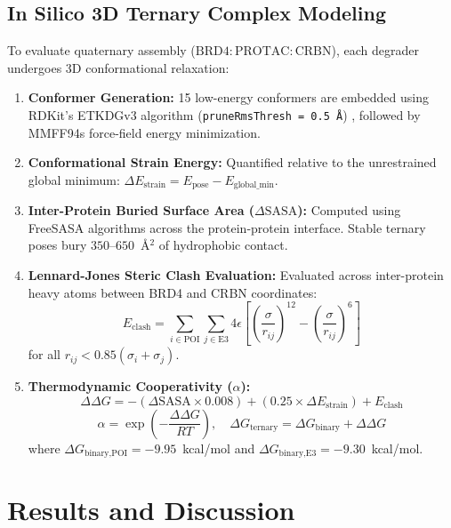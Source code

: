 \documentclass[conference]{IEEEtran}
\begin{document}
\subsection{In Silico 3D Ternary Complex Modeling}
To evaluate quaternary assembly ($\text{BRD4} : \text{PROTAC} : \text{CRBN}$), each degrader undergoes 3D conformational relaxation:
\begin{enumerate}
    \item \textbf{Conformer Generation:} 15 low-energy conformers are embedded using RDKit's ETKDGv3 algorithm (\texttt{pruneRmsThresh = 0.5 \AA}) \cite{riniker2015}, followed by MMFF94s force-field energy minimization.
    \item \textbf{Conformational Strain Energy:} Quantified relative to the unrestrained global minimum: $\Delta E_{\text{strain}} = E_{\text{pose}} - E_{\text{global\_min}}$.
    \item \textbf{Inter-Protein Buried Surface Area ($\Delta\text{SASA}$):} Computed using FreeSASA algorithms across the protein-protein interface. Stable ternary poses bury $350\text{--}650$~\AA$^2$ of hydrophobic contact.
    \item \textbf{Lennard-Jones Steric Clash Evaluation:} Evaluated across inter-protein heavy atoms between BRD4 and CRBN coordinates:
    \begin{equation}
    E_{\text{clash}} = \sum_{i \in \text{POI}} \sum_{j \in \text{E3}} 4\epsilon \left[ \left(\frac{\sigma}{r_{ij}}\right)^{12} - \left(\frac{\sigma}{r_{ij}}\right)^6 \right]
    \end{equation}
    for all $r_{ij} < 0.85(\sigma_i + \sigma_j)$.
    \item \textbf{Thermodynamic Cooperativity ($\alpha$):}
    \begin{equation}
    \Delta\Delta G = -(\Delta\text{SASA} \times 0.008) + (0.25 \times \Delta E_{\text{strain}}) + E_{\text{clash}}
    \end{equation}
    \begin{equation}
    \alpha = \exp\left(-\frac{\Delta\Delta G}{RT}\right), \quad \Delta G_{\text{ternary}} = \Delta G_{\text{binary}} + \Delta\Delta G
    \end{equation}
    where $\Delta G_{\text{binary,POI}} = -9.95$~kcal/mol and $\Delta G_{\text{binary,E3}} = -9.30$~kcal/mol.
\end{enumerate}

\section{Results and Discussion}
\end{document}

